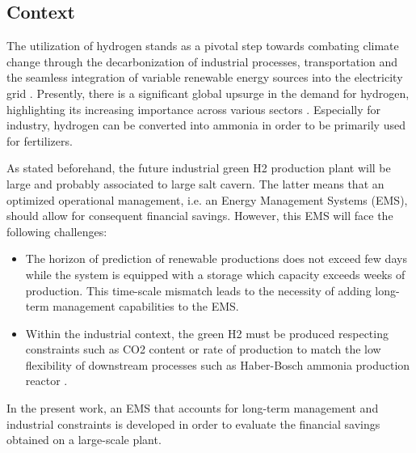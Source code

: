 \subsection{Context}

\begin{frame}
The utilization of hydrogen stands as a pivotal step towards combating climate change through the decarbonization of industrial processes, transportation and the seamless integration of variable renewable energy sources into the electricity grid \cite{shukla2022climate}.
Presently, there is a significant global upsurge in the demand for hydrogen, highlighting its increasing importance across various sectors \cite{iea_global_2022}. Especially for industry, hydrogen can be converted into ammonia in order to be primarily used for fertilizers. 
\end{frame}

\begin{frame}
As stated beforehand, the future industrial green H2 production plant will be large and probably associated to large salt cavern. The latter means that an optimized operational management, i.e. an Energy Management Systems (EMS), should allow for consequent financial savings. However, this EMS will face the following challenges: 
\begin{itemize}
    \item The horizon of prediction of renewable productions does not exceed few days while the system is equipped with a storage which capacity exceeds weeks of production. This time-scale mismatch leads to the necessity of adding long-term management capabilities to the EMS.
    \item Within the industrial context, the green H2 must be produced respecting constraints such as CO2 content \cite{green_hydrogen_organisation_green_2023} or rate of production to match the low flexibility of downstream processes such as Haber-Bosch ammonia production reactor \cite{shamiri_modeling_2021}.
\end{itemize}
In the present work, an EMS that accounts for long-term management and industrial constraints is developed in order to evaluate the financial savings obtained on a large-scale plant.
\end{frame}
